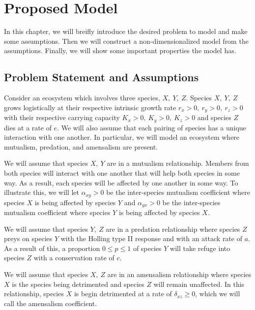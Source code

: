 % 
\chapter{Proposed Model}\label{ch:proposed-model}
In this chapter, we will breifly introduce the desired problem to model and make some assumptions. Then we will construct a non-dimensionalized model from the assumptions. Finally, we will show some important properties the model has.

\section{Problem Statement and Assumptions}
Consider an ecosystem which involves three species, $X,\ Y,\ Z$. Species $X,\ Y,\ Z$ grows logistically at their respective intrinsic growth rate $r_x>0,\ r_y>0,\ r_z>0$ with their respective carrying capacity $K_x>0,\ K_y>0,\ K_z>0$ and species $Z$ dies at a rate of $e$. We will also assume that each pairing of species has a unique interaction with one another. In particular, we will model an ecosystem where mutualism, predation, and amensalism are present. %

We will assume that species $X,\ Y$ are in a mutualism relationship. Members from both species will interact with one another that will help both species in some way. As a result, each species will be affected by one another in some way. To illustrate this, we will let $\alpha_{xy} > 0$ be the inter-species mutualism coefficient where species $X$ is being affected by species $Y$ and $\alpha_{yx} > 0$ be the inter-species mutualism coefficient where species $Y$ is being affected by species $X$.

We will assume that species $Y,\ Z$ are in a predation relationship where species $Z$ preys on species $Y$ with the Holling type II response and with an attack rate of $a$. As a result of this, a proportion $0 \leq p \leq 1$ of species $Y$ will take refuge into species $Z$ with a conservation rate of $c$. 

We will assume that species $X,\ Z$ are in an amensalism relationship where species $X$ is the species being detrimented and species $Z$ will remain unaffected. In this relationship, species $X$ is begin detrimented at a rate of $\delta_{xz} \geq 0$, which we will call the amensalism coefficient. 


